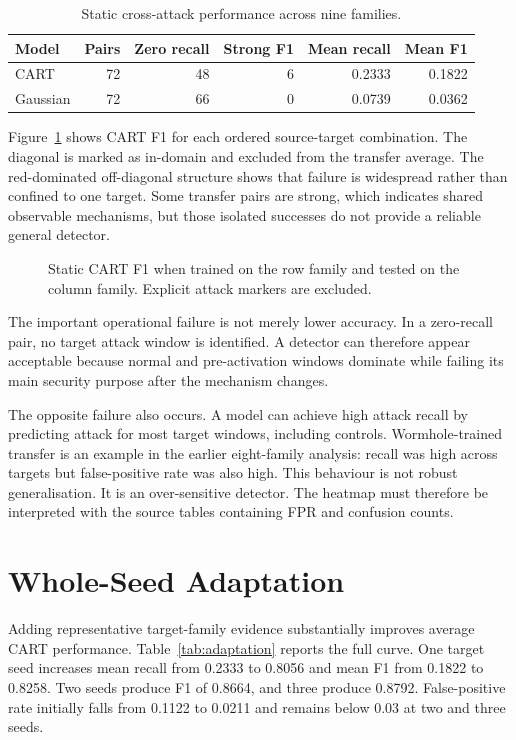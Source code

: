 \begin{table}[H]
\centering
\caption{Static cross-attack performance across nine families.}
\label{tab:cross-static}
\begin{tabular}{lrrrrr}
\toprule
Model & Pairs & Zero recall & Strong F1 & Mean recall & Mean F1 \\
\midrule
CART & 72 & 48 & 6 & 0.2333 & 0.1822 \\
Gaussian & 72 & 66 & 0 & 0.0739 & 0.0362 \\
\bottomrule
\end{tabular}
\end{table}

Figure~\ref{fig:cross-heatmap} shows CART F1 for each ordered source-target combination. The diagonal is marked as in-domain and excluded from the transfer average. The red-dominated off-diagonal structure shows that failure is widespread rather than confined to one target. Some transfer pairs are strong, which indicates shared observable mechanisms, but those isolated successes do not provide a reliable general detector.

\begin{figure}[H]
\centering

\caption{Static CART F1 when trained on the row family and tested on the column family. Explicit attack markers are excluded.}
\label{fig:cross-heatmap}
\end{figure}

The important operational failure is not merely lower accuracy. In a zero-recall pair, no target attack window is identified. A detector can therefore appear acceptable because normal and pre-activation windows dominate while failing its main security purpose after the mechanism changes.

The opposite failure also occurs. A model can achieve high attack recall by predicting attack for most target windows, including controls. Wormhole-trained transfer is an example in the earlier eight-family analysis: recall was high across targets but false-positive rate was also high. This behaviour is not robust generalisation. It is an over-sensitive detector. The heatmap must therefore be interpreted with the source tables containing FPR and confusion counts.

\section{Whole-Seed Adaptation}

Adding representative target-family evidence substantially improves average CART performance. Table~\ref{tab:adaptation} reports the full curve. One target seed increases mean recall from 0.2333 to 0.8056 and mean F1 from 0.1822 to 0.8258. Two seeds produce F1 of 0.8664, and three produce 0.8792. False-positive rate initially falls from 0.1122 to 0.0211 and remains below 0.03 at two and three seeds.

